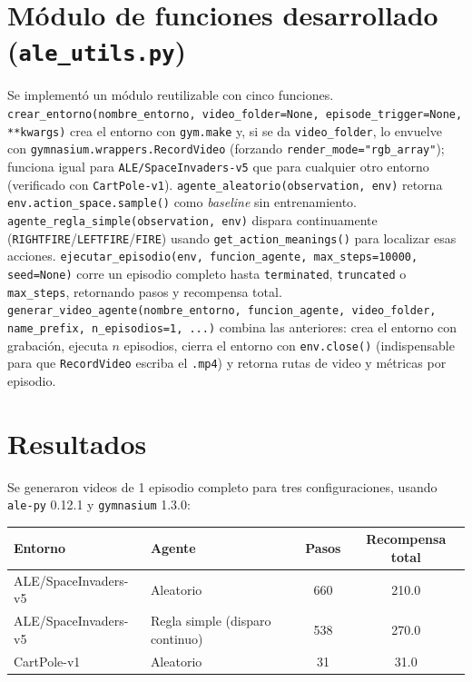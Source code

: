 \documentclass[10pt]{article}
\begin{document}
\section{Módulo de funciones desarrollado (\texttt{ale\_utils.py})}

Se implementó un módulo reutilizable con cinco funciones. \texttt{crear\_entorno(nombre\_entorno, video\_folder=None, episode\_trigger=None, **kwargs)} crea el entorno con \texttt{gym.make} y, si se da \texttt{video\_folder}, lo envuelve con \texttt{gymnasium.wrappers.RecordVideo} (forzando \texttt{render\_mode="rgb\_array"}); funciona igual para \texttt{ALE/SpaceInvaders-v5} que para cualquier otro entorno (verificado con \texttt{CartPole-v1}). \texttt{agente\_aleatorio(observation, env)} retorna \texttt{env.action\_space.sample()} como \emph{baseline} sin entrenamiento. \texttt{agente\_regla\_simple(observation, env)} dispara continuamente (\texttt{RIGHTFIRE}/\texttt{LEFTFIRE}/\texttt{FIRE}) usando \texttt{get\_action\_meanings()} para localizar esas acciones. \texttt{ejecutar\_episodio(env, funcion\_agente, max\_steps=10000, seed=None)} corre un episodio completo hasta \texttt{terminated}, \texttt{truncated} o \texttt{max\_steps}, retornando pasos y recompensa total. \texttt{generar\_video\_agente(nombre\_entorno, funcion\_agente, video\_folder, name\_prefix, n\_episodios=1, ...)} combina las anteriores: crea el entorno con grabación, ejecuta $n$ episodios, cierra el entorno con \texttt{env.close()} (indispensable para que \texttt{RecordVideo} escriba el \texttt{.mp4}) y retorna rutas de video y métricas por episodio.

\section{Resultados}

Se generaron videos de 1 episodio completo para tres configuraciones, usando \texttt{ale-py} 0.12.1 y \texttt{gymnasium} 1.3.0:

\begin{center}
\begin{tabular}{llcc}
\toprule
Entorno & Agente & Pasos & Recompensa total \\
\midrule
ALE/SpaceInvaders-v5 & Aleatorio & 660 & 210.0 \\
ALE/SpaceInvaders-v5 & Regla simple (disparo continuo) & 538 & 270.0 \\
CartPole-v1 & Aleatorio & 31 & 31.0 \\
\bottomrule
\end{tabular}
\end{center}
\end{document}
